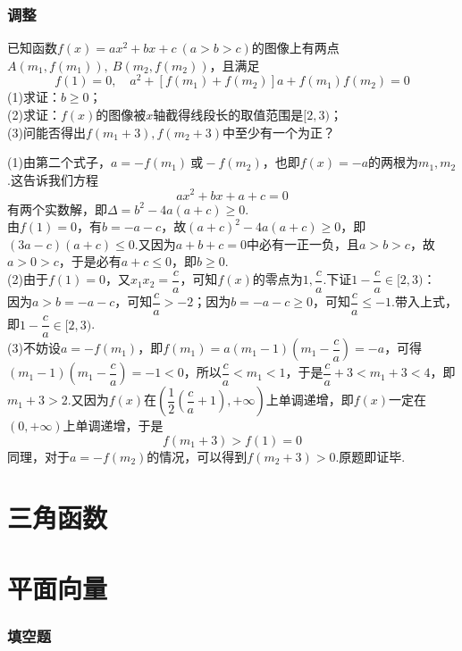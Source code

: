\documentclass[cn,hazy,black,10pt,normal]{elegantnote}
\newcommand{\ssb}[1]{\left( #1 \right)}
\begin{document}
\subsection{调整}



\begin{problem} %
	已知函数$f(x)=ax^2+bx+c~(a>b>c)$的图像上有两点$A(m_1,f(m_1)),~B(m_2,f(m_2))$，且满足$$f(1)=0,\quad a^2+[f(m_1)+f(m_2)]a+f(m_1)f(m_2)=0$$
	(1)求证：$b\geq 0$； \\
	(2)求证：$f(x)$的图像被$x$轴截得线段长的取值范围是$[2,3)$； \\
	(3)问能否得出$f(m_1+3),f(m_2+3)$中至少有一个为正？
\end{problem}
\begin{solution}
	(1)由第二个式子，$a=-f(m_1)~\textit{或}-f(m_2)$，也即$f(x)=-a$的两根为$m_1,m_2$.这告诉我们方程$$ax^2+bx+a+c=0$$有两个实数解，即$\Delta = b^2-4a(a+c) \geq 0$. \\
	由$f(1)=0$，有$b=-a-c$，故$(a+c)^2-4a(a+c) \geq 0$，即$(3a-c)(a+c) \leq 0$.又因为$a+b+c=0$中必有一正一负，且$a>b>c$，故$a>0>c$，于是必有$a+c \leq 0$，即$b \geq 0$. \\
	(2)由于$f(1)=0$，又$x_1x_2=\dfrac{c}{a}$，可知$f(x)$的零点为$1,\dfrac{c}{a}$.下证$1-\dfrac{c}{a} \in [2,3)$：\\
	因为$a>b=-a-c$，可知$\dfrac{c}{a} > -2$；因为$b=-a-c \geq 0$，可知$\dfrac{c}{a} \leq -1$.带入上式，即$1-\dfrac{c}{a} \in [2,3)$. \\
	(3)不妨设$a=-f(m_1)$，即$f(m_1) = a(m_1-1)(m_1-\dfrac{c}{a}) = -a$，可得$(m_1-1)(m_1-\dfrac{c}{a}) = -1 <0$，所以$\dfrac{c}{a} < m_1 < 1$，于是$\dfrac{c}{a}+3<m_1+3<4$，即$m_1+3>2$.又因为$f(x)$在$\ssb{\dfrac{1}{2}\ssb{\dfrac{c}{a}+1},+\infty}$上单调递增，即$f(x)$一定在$(0,+\infty)$上单调递增，于是$$f(m_1+3) > f(1) = 0$$
	同理，对于$a=-f(m_2)$的情况，可以得到$f(m_2+3)>0$.原题即证毕.
\end{solution}

\chapter{三角函数}

\chapter{平面向量}

\subsection*{填空题}
\end{document}
